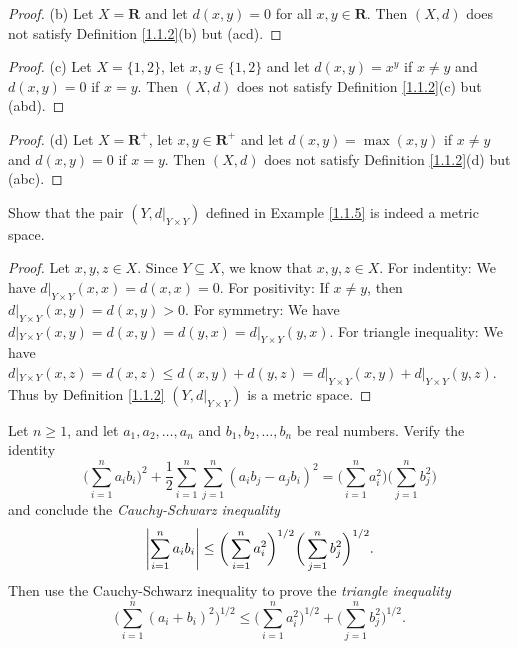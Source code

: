 \begin{proof}{(b)}
    Let \(X = \mathbf{R}\) and let \(d(x, y) = 0\) for all \(x, y \in \mathbf{R}\).
    Then \((X, d)\) does not satisfy Definition \ref{1.1.2}(b) but (acd).
\end{proof}

\begin{proof}{(c)}
    Let \(X = \{1, 2\}\), let \(x, y \in \{1, 2\}\) and let \(d(x, y) = x^y\) if \(x \neq y\) and \(d(x, y) = 0\) if \(x = y\).
    Then \((X, d)\) does not satisfy Definition \ref{1.1.2}(c) but (abd).
\end{proof}

\begin{proof}{(d)}
    Let \(X = \mathbf{R}^+\), let \(x, y \in \mathbf{R}^+\) and let \(d(x, y) = \max(x, y)\) if \(x \neq y\) and \(d(x, y) = 0\) if \(x = y\).
    Then \((X, d)\) does not satisfy Definition \ref{1.1.2}(d) but (abc).
\end{proof}

\begin{exercise}\label{ex 1.1.4}
    Show that the pair \((Y, d|_{Y \times Y})\) defined in Example \ref{1.1.5} is indeed a metric space.
\end{exercise}

\begin{proof}
    Let \(x, y, z \in X\).
    Since \(Y \subseteq X\), we know that \(x, y, z \in X\).
    For indentity:
    We have \(d|_{Y \times Y}(x, x) = d(x, x) = 0\).
    For positivity:
    If \(x \neq y\), then \(d|_{Y \times Y}(x, y) = d(x, y) > 0\).
    For symmetry:
    We have \(d|_{Y \times Y}(x, y) = d(x, y) = d(y, x) = d|_{Y \times Y}(y, x)\).
    For triangle inequality:
    We have \(d|_{Y \times Y}(x, z) = d(x, z) \leq d(x, y) + d(y, z) = d|_{Y \times Y}(x, y) + d|_{Y \times Y}(y, z)\).
    Thus by Definition \ref{1.1.2} \((Y, d|_{Y \times Y})\) is a metric space.
\end{proof}

\begin{exercise}\label{ex 1.1.5}
    Let \(n \geq 1\), and let \(a_1, a_2, \dots, a_n\) and \(b_1, b_2, \dots, b_n\) be real numbers.
    Verify the identity
    \[
        \bigg(\sum_{i = 1}^n a_i b_i\bigg)^2 + \frac{1}{2} \sum_{i = 1}^n \sum_{j = 1}^n (a_i b_j - a_j b_i)^2 = \bigg(\sum_{i = 1}^n a_i^2\bigg) \bigg(\sum_{j = 1}^n b_j^2\bigg)
    \]
    and conclude the \emph{Cauchy-Schwarz inequality}
    \[
        \abs*{\sum_{i = 1}^n a_i b_i} \leq \bigg(\sum_{i = 1}^n a_i^2\bigg)^{1 / 2} \bigg(\sum_{j = 1}^n b_j^2\bigg)^{1 / 2}.
    \]
    Then use the Cauchy-Schwarz inequality to prove the \emph{triangle inequality}
    \[
        \bigg(\sum_{i = 1}^n (a_i + b_i)^2\bigg)^{1 / 2} \leq \bigg(\sum_{i = 1}^n a_i^2\bigg)^{1 / 2} + \bigg(\sum_{j = 1}^n b_j^2\bigg)^{1 / 2}.
    \]
\end{exercise}

